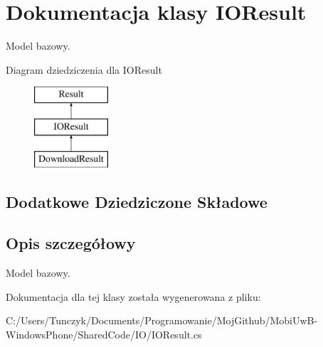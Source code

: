 \hypertarget{a00029}{}\section{Dokumentacja klasy I\+O\+Result}
\label{a00029}


Model bazowy.  


Diagram dziedziczenia dla I\+O\+Result\begin{figure}[H]
\begin{center}
\leavevmode
\includegraphics[height=3.000000cm]{d5/d16/a00029}
\end{center}
\end{figure}
\subsection*{Dodatkowe Dziedziczone Składowe}


\subsection{Opis szczegółowy}
Model bazowy. 



Dokumentacja dla tej klasy została wygenerowana z pliku\+:\begin{DoxyCompactItemize}
\item 
C\+:/\+Users/\+Tunczyk/\+Documents/\+Programowanie/\+Moj\+Github/\+Mobi\+Uw\+B-\/\+Windows\+Phone/\+Shared\+Code/\+I\+O/I\+O\+Result.\+cs\end{DoxyCompactItemize}
